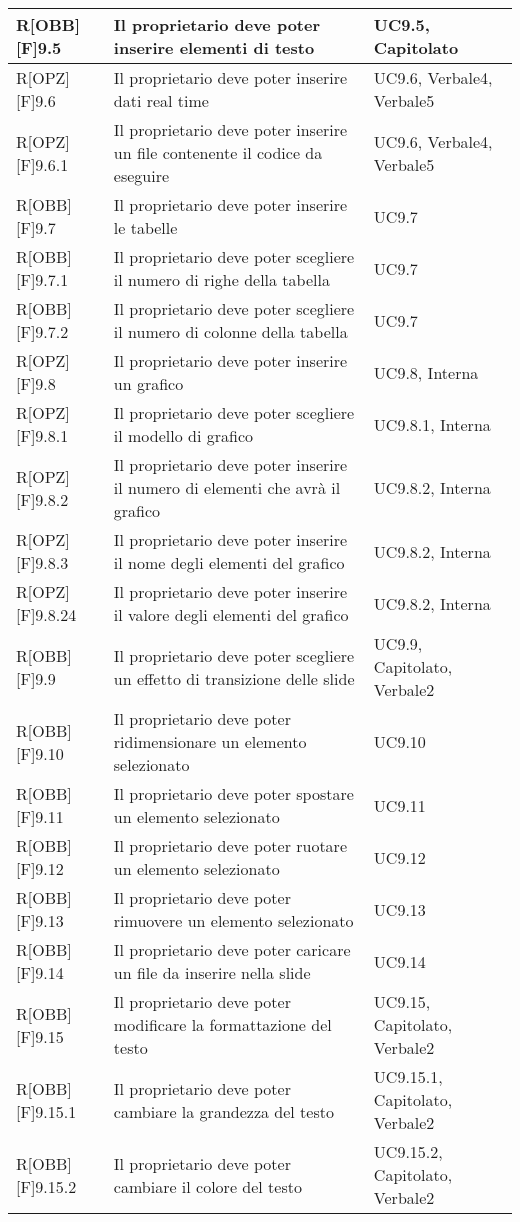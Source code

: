 	\newpage
	
	\begin{table}[h]
		\begin{tabular}{|p{}|p{}|p{}|}
			\midrule
			
R[OBB][F]9.5 & Il proprietario deve poter inserire elementi di testo & UC9.5, Capitolato \\ \midrule
R[OPZ][F]9.6 & Il proprietario deve poter inserire dati \gls{real time} & UC9.6, Verbale4, Verbale5 \\ \midrule
R[OPZ][F]9.6.1 & Il proprietario deve poter inserire un file contenente il codice da eseguire  & UC9.6, Verbale4, Verbale5 \\ \midrule
R[OBB][F]9.7 & Il proprietario deve poter inserire le tabelle & UC9.7 \\ \midrule
R[OBB][F]9.7.1 & Il proprietario deve poter scegliere il numero di righe della tabella & UC9.7 \\ \midrule			
R[OBB][F]9.7.2 & Il proprietario deve poter scegliere il numero di colonne della tabella & UC9.7 \\ \midrule
R[OPZ][F]9.8 & Il proprietario deve poter inserire un grafico & UC9.8, Interna \\ \midrule
R[OPZ][F]9.8.1 & Il proprietario deve poter scegliere il modello di grafico  & UC9.8.1, Interna \\ \midrule
R[OPZ][F]9.8.2 & Il proprietario deve poter inserire il numero di elementi che avrà il grafico & UC9.8.2, Interna \\ \midrule
R[OPZ][F]9.8.3 & Il proprietario deve poter inserire il nome degli elementi del grafico  & UC9.8.2, Interna \\ \midrule
R[OPZ][F]9.8.24 & Il proprietario deve poter inserire il valore degli elementi del grafico & UC9.8.2, Interna \\ \midrule
R[OBB][F]9.9 & Il proprietario deve poter scegliere un effetto di transizione delle \gls{slide} & UC9.9, Capitolato, Verbale2 \\ \midrule
R[OBB][F]9.10 & Il proprietario deve poter ridimensionare un elemento selezionato & UC9.10 \\ \midrule
R[OBB][F]9.11 & Il proprietario deve poter spostare un elemento selezionato & UC9.11 \\ \midrule
R[OBB][F]9.12 & Il proprietario deve poter ruotare un elemento selezionato & UC9.12 \\ \midrule
R[OBB][F]9.13 & Il proprietario deve poter rimuovere un elemento selezionato & UC9.13 \\ \midrule
R[OBB][F]9.14 & Il proprietario deve poter caricare un file da inserire nella \gls{slide} & UC9.14 \\ \midrule
R[OBB][F]9.15 & Il proprietario deve poter modificare la formattazione del testo & UC9.15, Capitolato, Verbale2 \\ \midrule
R[OBB][F]9.15.1 & Il proprietario deve poter cambiare la grandezza del testo & UC9.15.1, Capitolato, Verbale2 \\ \midrule
R[OBB][F]9.15.2 & Il proprietario deve poter cambiare il colore del testo & UC9.15.2, Capitolato, Verbale2 \\ \midrule


\end{tabular}
\end{table}
